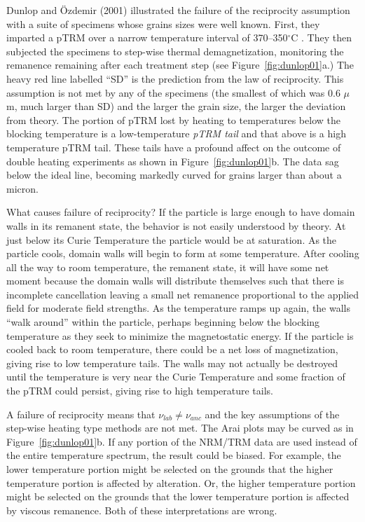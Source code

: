 Dunlop and \"Ozdemir (2001)   illustrated the failure of the  reciprocity assumption with a suite of specimens whose grains sizes were well known.  First, they  imparted a pTRM over a narrow temperature interval of 370--350$^{\circ}$C . They then subjected the specimens to step-wise thermal demagnetization, monitoring the remanence remaining after each treatment step (see Figure~\ref{fig:dunlop01}a.)    The heavy red line labelled ``SD'' is the prediction from the 
law of reciprocity.  This assumption is not met by any of the specimens (the smallest of which was 0.6 $\mu$m,  much larger than SD) and the larger the grain size, the larger the deviation from theory.   The portion of pTRM lost by heating to temperatures below the blocking temperature is a low-temperature 
{\it pTRM tail}  and that above is a high temperature pTRM tail.     These tails have a profound affect on the outcome of double heating  experiments as shown in Figure~\ref{fig:dunlop01}b.    The data sag below the ideal line, becoming markedly curved for  grains larger than about a micron.   


What causes failure of reciprocity?   
If the particle is large enough to have domain walls in its remanent state,   the behavior is  not easily understood by theory.  At just below its Curie Temperature  the particle would be at saturation.    As the particle cools,  domain walls will begin to form at some temperature.  After cooling all the way to room temperature, the  remanent state, it  will have some net moment because the domain walls will distribute themselves such that there is incomplete cancellation leaving a small net remanence proportional to the applied field for moderate field strengths.  As the temperature ramps up again, the walls  ``walk around'' within the particle, perhaps beginning below the blocking temperature as they seek to minimize the magnetostatic energy.  If the particle is cooled back to room temperature, there could be  a net loss of magnetization, giving rise to low temperature tails.  The walls may  not actually be destroyed until the  temperature is very near the Curie Temperature and some fraction of the pTRM could persist,  giving rise to high temperature tails.  


A failure of reciprocity means that $\nu_{lab} \neq \nu_{anc}$ and the key assumptions of the step-wise heating type methods are not met.  The  Arai plots  may be curved as in Figure~\ref{fig:dunlop01}b.   If any portion of the NRM/TRM data are used  instead of the entire temperature spectrum, the result could be biased.  For example,  the lower temperature portion might be selected on the grounds that the higher temperature portion is affected by alteration. Or, the higher temperature portion might be selected on the grounds that the lower temperature portion is affected by viscous remanence.  Both of these interpretations are  wrong.   

